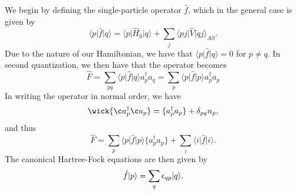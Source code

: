 We begin by defining the single-particle operator $\hat{f}$, which in the general case is given by
\begin{equation*}
    \langle p \vert \hat{f} \vert q \rangle = \langle p \vert \hat{H}_0 \vert q \rangle + \sum_{j} \langle p j \vert \hat{V} \vert q j \rangle_{AS}.
\end{equation*}
Due to the nature of our Hamiltonian, we have that $\langle p \vert \hat{f} \vert q \rangle = 0$ for $p \neq q$.
In second quantization, we then have that the operator becomes
\begin{equation*}
    \hat{F}
    = \sum_{pq} \langle p \vert \hat{f} \vert q \rangle a_p^\dagger a_q
    = \sum_{p} \langle p \vert \hat{f} \vert p \rangle a_p^\dagger a_p
\end{equation*}
In writing the operator in normal order, we have
\begin{equation*}
    \wick{\c a_p^\dagger \c a_p} = \{ a_p^\dagger a_p \} + \delta_{pq} n_p,
\end{equation*}
and thus
\begin{equation*}
    \hat{F} = \sum_{p} \langle p \vert \hat{f} \vert p \rangle \{ a_p^\dagger a_p \} + \sum_{i} \langle i \vert \hat{f} \vert i \rangle.
\end{equation*}
The canonical Hartree-Fock equations are then given by
\begin{equation*}
    \hat{f} \lvert p\rangle = \sum_{q} \epsilon_{qp} \lvert q\rangle.
\end{equation*}
